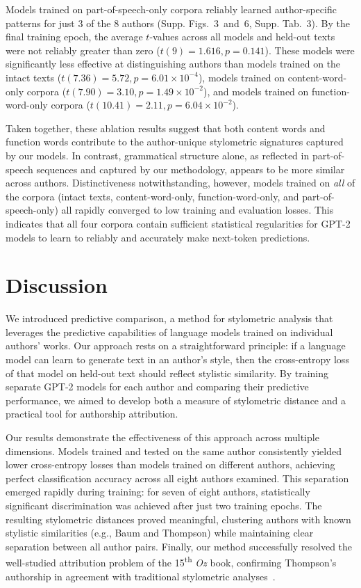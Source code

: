 \documentclass{llmxive}
\providecommand{\crossentropyPOS}{{3}}
\providecommand{\ttestsPOS}{{6}}
\providecommand{\authortablePOS}{{3}}
\begin{document}
Models trained on part-of-speech-only corpora reliably learned author-specific
patterns for just 3 of the 8 authors (Supp.
Figs.~\crossentropyPOS~and~\ttestsPOS, Supp. Tab.~\authortablePOS). By the
final training epoch, the average $t$-values across all models and held-out
texts were not reliably greater than zero ($t(9) = 1.616, p = 0.141$). These
models were significantly less effective at distinguishing authors than models
trained on the intact texts ($t(7.36) = 5.72, p = 6.01 \times 10^{-4}$), models
trained on content-word-only corpora ($t(7.90) = 3.10, p = 1.49 \times
10^{-2}$), and models trained on function-word-only corpora ($t(10.41) = 2.11,
p = 6.04 \times 10^{-2}$).

Taken together, these ablation results suggest that both content words and
function words contribute to the author-unique stylometric signatures captured
by our models. In contrast, grammatical structure alone, as reflected in
part-of-speech sequences and captured by our methodology, appears to be more
similar across authors. Distinctiveness notwithstanding, however, models
trained on \textit{all} of the corpora (intact texts, content-word-only,
function-word-only, and part-of-speech-only) all rapidly converged to low
training and evaluation losses. This indicates that all four corpora contain
sufficient statistical regularities for GPT-2 models to learn to reliably
and accurately make next-token predictions.

\section{Discussion}

We introduced predictive comparison, a method for stylometric analysis that
leverages the predictive capabilities of language models trained on individual
authors' works. Our approach rests on a straightforward principle: if a
language model can learn to generate text in an author's style, then the
cross-entropy loss of that model on held-out text should reflect stylistic
similarity. By training separate GPT-2 models for each author and comparing
their predictive performance, we aimed to develop both a measure of stylometric
distance and a practical tool for authorship attribution.

Our results demonstrate the effectiveness of this approach across multiple
dimensions. Models trained and tested on the same author consistently yielded
lower cross-entropy losses than models trained on different authors, achieving
perfect classification accuracy across all eight authors examined. This
separation emerged rapidly during training: for seven of eight authors,
statistically significant discrimination was achieved after just two training
epochs. The resulting stylometric distances proved meaningful, clustering
authors with known stylistic similarities (e.g., Baum and Thompson) while
maintaining clear separation between all author pairs. Finally, our method
successfully resolved the well-studied attribution problem of the
15\textsuperscript{th} \emph{Oz} book, confirming Thompson's authorship in
agreement with traditional stylometric analyses~\citep{NiloBino03}.
\end{document}

